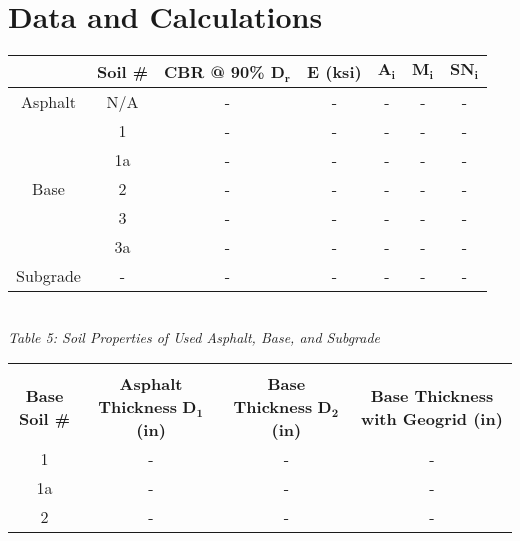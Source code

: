 \documentclass{article}
\begin{document}
\section{Data and Calculations}
\begin{center}

    \begin{tabular}{|c|c|ccccc|}
        \hline
        & \textbf{Soil \#} & \textbf{CBR @ 90\% $\bm{D_r}$} & $\bm{E}$ \textbf{(ksi)} & $\bm{A_i}$ & $\bm{M_i}$ & $\bm{SN_i}$  \\\hline
        Asphalt               & N/A     & -        & -       & -    & -    & -      \\
        \multirow{5}{*}{Base} & 1       & -          & -       & -    & -    & -      \\
        & 1a      & -          & -       & -    & -    & -      \\
        & 2       & -          & -       & -    & -    & -      \\
        & 3       & -          & -       & -    & -    & -      \\
        & 3a      & -          & -       & -    & -    & -      \\
        Subgrade              & -       & -          & -       & -    & -    & -     \\\hline
    \end{tabular}
    \vspace{3mm}
    \emph{\\Table 5: Soil Properties of Used Asphalt, Base, and Subgrade\\}
    \vspace{7mm}
    \begin{tabular}{|c|ccc|}
        \hline
        &&&\\
        \textbf{Base Soil \#} & \shortstack[c]{\textbf{Asphalt Thickness}\\ \textbf{$\bm{D_1}$ (in)}} & \shortstack[c]{\textbf{Base Thickness}\\ \textbf{$\bm{D_2}$ (in)}} & \textbf{Base Thickness with Geogrid (in)}  \\\hline
        1              & -                            & -                         & -                                 \\
        1a             & -                            & -                          & -                                 \\
        2              & -                            & -                          & -                                 \\

\end{tabular}
\end{center}
\end{document}
